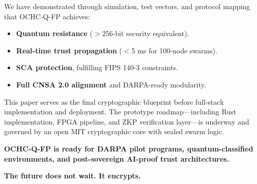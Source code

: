 \documentclass[12pt]{article}
\begin{document}
We have demonstrated through simulation, test vectors, and protocol mapping that OCHC-Q-FP achieves:

\begin{itemize}
    \item \textbf{Quantum resistance} ($>256$-bit security equivalent).
    \item \textbf{Real-time trust propagation} ($<$5 ms for 100-node swarms).
    \item \textbf{SCA protection}, fulfilling FIPS 140-3 constraints.
    \item \textbf{Full CNSA 2.0 alignment} and DARPA-ready modularity.
\end{itemize}

\vspace{1em}

This paper serves as the final cryptographic blueprint before full-stack implementation and deployment. The prototype roadmap—including Rust implementation, FPGA pipeline, and ZKP verification layer—is underway and governed by an open MIT cryptographic core with sealed swarm logic.

\textbf{OCHC-Q-FP is ready for DARPA pilot programs, quantum-classified environments, and post-sovereign AI-proof trust architectures.}

\textbf{The future does not wait. It encrypts.}
\end{document}
